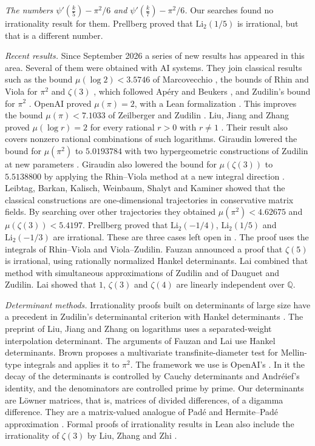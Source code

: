 \documentclass[11pt]{amsart}
\theoremstyle{definition}
\theoremstyle{remark}
\numberwithin{equation}{section}
\newcommand{\Q}{\mathbb Q}
\begin{document}
\emph{The numbers $\psi'(\frac k5)-\pi^2/6$ and $\psi'(\frac k7)-\pi^2/6$.} Our searches found no irrationality result for
them. Prellberg \cite{Prellberg26} proved that $\mathrm{Li}_2(1/5)$ is irrational, but that is a different number.

\emph{Recent results.} Since September 2026 a series of new results has appeared in this area. Several of them were
obtained with AI systems. They join classical results such as the bound $\mu(\log2)<3.5746$ of Marcovecchio
\cite{Marcovecchio09}, the bounds of Rhin and Viola for $\pi^2$ and $\zeta(3)$ \cite{RhinViola96,RhinViola01}, which
followed Ap\'ery and Beukers \cite{Apery79,Beukers79}, and Zudilin's bound for $\pi^2$ \cite{Zudilin14}. OpenAI proved
$\mu(\pi)=2$, with a Lean formalization \cite{OpenAIPi2026}. This improves the bound $\mu(\pi)<7.1033$ of Zeilberger and
Zudilin \cite{ZeilbergerZudilin20}. Liu, Jiang and Zhang proved $\mu(\log r)=2$ for every rational $r>0$ with $r\ne1$
\cite{LiuJiangZhang26}. Their result also covers nonzero rational combinations of such logarithms. Giraudin lowered the
bound for $\mu(\pi^2)$ to $5.0193784$ with two hypergeometric constructions of Zudilin \cite{Zudilin14} at new parameters
\cite{Giraudin26}. Giraudin also lowered the bound for $\mu(\zeta(3))$ to $5.5138800$ by applying the Rhin--Viola method
at a new integral direction \cite{Giraudin26z3}. Leibtag, Barkan, Kalisch, Weinbaum, Shalyt and Kaminer \cite{LBKWSK26}
showed that the classical constructions are one-dimensional trajectories in conservative matrix fields. By searching over
other trajectories they obtained $\mu(\pi^2)<4.62675$ and $\mu(\zeta(3))<5.4197$. Prellberg \cite{Prellberg26} proved that
$\mathrm{Li}_2(-1/4)$, $\mathrm{Li}_2(1/5)$ and $\mathrm{Li}_2(-1/3)$ are irrational. These are three cases left open in
\cite{CDT2024}. The proof uses the integrals of Rhin--Viola and Viola--Zudilin. Fauzan \cite{Fauzan2026} announced a proof
that $\zeta(5)$ is irrational, using rationally normalized Hankel determinants. Lai \cite{Lai2026} combined that method
with simultaneous approximations of Zudilin and of Dauguet and Zudilin. Lai showed that $1$, $\zeta(3)$ and $\zeta(4)$
are linearly independent over $\Q$.

\emph{Determinant methods.} Irrationality proofs built on determinants of large size have a precedent in Zudilin's
determinantal criterion with Hankel determinants \cite{Zudilin}. The preprint of Liu, Jiang and Zhang on logarithms
\cite{LiuJiangZhang26} uses a separated-weight interpolation determinant. The arguments of Fauzan and Lai
\cite{Fauzan2026,Lai2026} use Hankel determinants. Brown \cite{Brown26} proposes a multivariate transfinite-diameter test
for Mellin-type integrals and applies it to $\pi^2$. The framework we use is OpenAI's \cite{OpenAI2026}. In it the decay
of the determinants is controlled by Cauchy determinants and Andr\'eief's identity, and the denominators are controlled
prime by prime. Our determinants are L\"owner matrices, that is, matrices of divided differences, of a digamma
difference. They are a matrix-valued analogue of Pad\'e and Hermite--Pad\'e approximation \cite{NikishinSorokin91}.
Formal proofs of irrationality results in Lean also include the irrationality of $\zeta(3)$ by Liu, Zhang and Zhi
\cite{LZZ25}.
\end{document}
